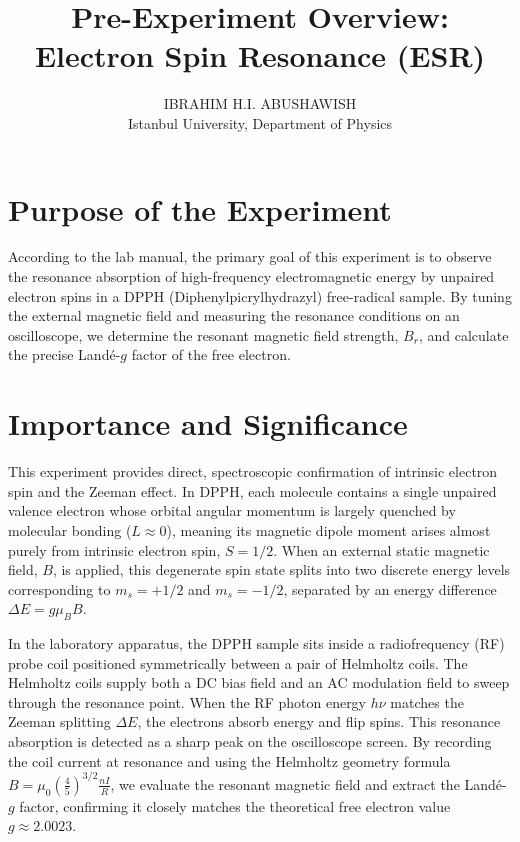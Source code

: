 \documentclass[11pt,a4paper]{article}
\title{\textbf{Pre-Experiment Overview:\\ Electron Spin Resonance (ESR)}}
\author{IBRAHIM H.I. ABUSHAWISH \\ Istanbul University, Department of Physics}
\date{}
\begin{document}
\maketitle

\section*{Purpose of the Experiment}
According to the lab manual, the primary goal of this experiment is to observe the resonance absorption of high-frequency electromagnetic energy by unpaired electron spins in a DPPH (Diphenylpicrylhydrazyl) free-radical sample. By tuning the external magnetic field and measuring the resonance conditions on an oscilloscope, we determine the resonant magnetic field strength, $B_r$, and calculate the precise Land\'e-$g$ factor of the free electron.

\section*{Importance and Significance}
This experiment provides direct, spectroscopic confirmation of intrinsic electron spin and the Zeeman effect. In DPPH, each molecule contains a single unpaired valence electron whose orbital angular momentum is largely quenched by molecular bonding ($L \approx 0$), meaning its magnetic dipole moment arises almost purely from intrinsic electron spin, $S = 1/2$. When an external static magnetic field, $B$, is applied, this degenerate spin state splits into two discrete energy levels corresponding to $m_s = +1/2$ and $m_s = -1/2$, separated by an energy difference $\Delta E = g \mu_B B$.

In the laboratory apparatus, the DPPH sample sits inside a radiofrequency (RF) probe coil positioned symmetrically between a pair of Helmholtz coils. The Helmholtz coils supply both a DC bias field and an AC modulation field to sweep through the resonance point. When the RF photon energy $h \nu$ matches the Zeeman splitting $\Delta E$, the electrons absorb energy and flip spins. This resonance absorption is detected as a sharp peak on the oscilloscope screen. By recording the coil current at resonance and using the Helmholtz geometry formula $B = \mu_0 \left(\frac{4}{5}\right)^{3/2} \frac{n I}{R}$, we evaluate the resonant magnetic field and extract the Land\'e-$g$ factor, confirming it closely matches the theoretical free electron value $g \approx 2.0023$.
\end{document}
